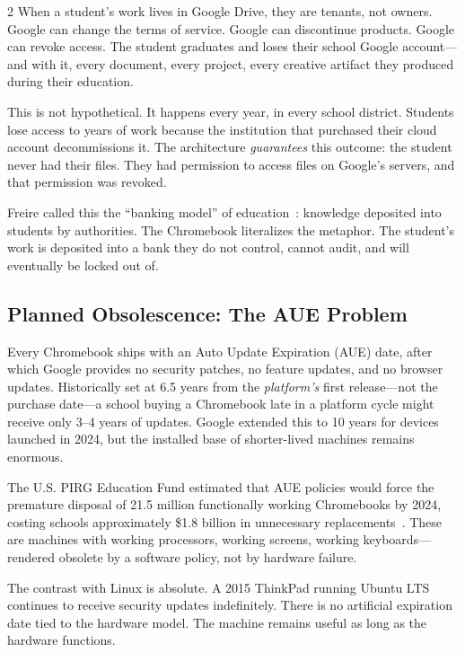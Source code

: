 \documentclass[11pt, a4paper]{article}
\begin{document}
\begin{multicols}{2}
When a student's work lives in Google Drive, they are tenants, not owners. Google can change the terms of service. Google can discontinue products. Google can revoke access. The student graduates and loses their school Google account---and with it, every document, every project, every creative artifact they produced during their education.

This is not hypothetical. It happens every year, in every school district. Students lose access to years of work because the institution that purchased their cloud account decommissions it. The architecture \emph{guarantees} this outcome: the student never had their files. They had permission to access files on Google's servers, and that permission was revoked.

Freire called this the ``banking model'' of education~\citep{freire1970pedagogy}: knowledge deposited into students by authorities. The Chromebook literalizes the metaphor. The student's work is deposited into a bank they do not control, cannot audit, and will eventually be locked out of.

\subsection{Planned Obsolescence: The AUE Problem}

Every Chromebook ships with an Auto Update Expiration (AUE) date, after which Google provides no security patches, no feature updates, and no browser updates. Historically set at 6.5 years from the \emph{platform's} first release---not the purchase date---a school buying a Chromebook late in a platform cycle might receive only 3--4 years of updates. Google extended this to 10 years for devices launched in 2024, but the installed base of shorter-lived machines remains enormous.

The U.S. PIRG Education Fund estimated that AUE policies would force the premature disposal of 21.5 million functionally working Chromebooks by 2024, costing schools approximately \$1.8 billion in unnecessary replacements~\citep{pirg2023chromebook}. These are machines with working processors, working screens, working keyboards---rendered obsolete by a software policy, not by hardware failure.

The contrast with Linux is absolute. A 2015 ThinkPad running Ubuntu LTS continues to receive security updates indefinitely. There is no artificial expiration date tied to the hardware model. The machine remains useful as long as the hardware functions.


\end{multicols}
\end{document}
